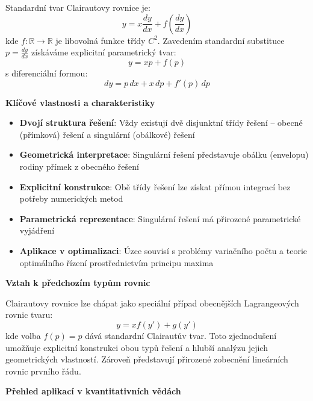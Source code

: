 Standardní tvar Clairautovy rovnice je:
\[
y = x \frac{dy}{dx} + f\left(\frac{dy}{dx}\right)
\]
kde $f: \mathbb{R} \to \mathbb{R}$ je libovolná funkce třídy $C^2$. Zavedením standardní substituce $p = \frac{dy}{dx}$ získáváme explicitní parametrický tvar:
\[
y = xp + f(p)
\]
s diferenciální formou:
\[
dy = p\,dx + x\,dp + f'(p)\,dp
\]

\vspace{1\baselineskip}

\noindent\textbf{Klíčové vlastnosti a charakteristiky}

\begin{itemize}
\item \textbf{Dvojí struktura řešení}: Vždy existují dvě disjunktní třídy řešení -- obecné (přímková) řešení a singulární (obálkové) řešení
\item \textbf{Geometrická interpretace}: Singulární řešení představuje obálku (envelopu) rodiny přímek z obecného řešení
\item \textbf{Explicitní konstrukce}: Obě třídy řešení lze získat přímou integrací bez potřeby numerických metod
\item \textbf{Parametrická reprezentace}: Singulární řešení má přirozené parametrické vyjádření
\item \textbf{Aplikace v optimalizaci}: Úzce souvisí s problémy variačního počtu a teorie optimálního řízení prostřednictvím principu maxima
\end{itemize}

\vspace{1\baselineskip}

\noindent\textbf{Vztah k předchozím typům rovnic}

Clairautovy rovnice lze chápat jako speciální případ obecnějších Lagrangeových rovnic tvaru:
\[
y = xf(y') + g(y')
\]
kde volba $f(p) = p$ dává standardní Clairautův tvar. Toto zjednodušení umožňuje explicitní konstrukci obou typů řešení a hlubší analýzu jejich geometrických vlastností. Zároveň představují přirozené zobecnění lineárních rovnic prvního řádu.

\vspace{1\baselineskip}

\noindent\textbf{Přehled aplikací v kvantitativních vědách}

